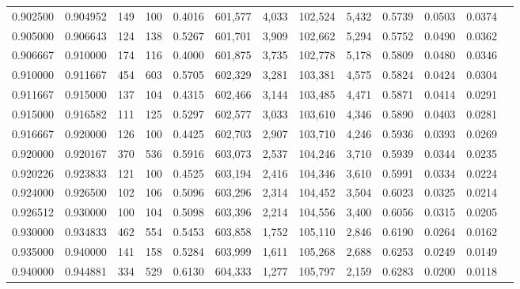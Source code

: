 \begin{tabular}{rrrrrrrrrrrrr}
0.902500 & 0.904952 &   149 & 100 &                                     0.4016 & 601,577 &   4,033 & 102,524 &   5,432 & 0.5739 & 0.0503 & 0.0374 \\
0.905000 & 0.906643 &   124 & 138 &                                     0.5267 & 601,701 &   3,909 & 102,662 &   5,294 & 0.5752 & 0.0490 & 0.0362 \\
0.906667 & 0.910000 &   174 & 116 &                                     0.4000 & 601,875 &   3,735 & 102,778 &   5,178 & 0.5809 & 0.0480 & 0.0346 \\
0.910000 & 0.911667 &   454 & 603 &                                     0.5705 & 602,329 &   3,281 & 103,381 &   4,575 & 0.5824 & 0.0424 & 0.0304 \\
0.911667 & 0.915000 &   137 & 104 &                                     0.4315 & 602,466 &   3,144 & 103,485 &   4,471 & 0.5871 & 0.0414 & 0.0291 \\
0.915000 & 0.916582 &   111 & 125 &                                     0.5297 & 602,577 &   3,033 & 103,610 &   4,346 & 0.5890 & 0.0403 & 0.0281 \\
0.916667 & 0.920000 &   126 & 100 &                                     0.4425 & 602,703 &   2,907 & 103,710 &   4,246 & 0.5936 & 0.0393 & 0.0269 \\
0.920000 & 0.920167 &   370 & 536 &                                     0.5916 & 603,073 &   2,537 & 104,246 &   3,710 & 0.5939 & 0.0344 & 0.0235 \\
0.920226 & 0.923833 &   121 & 100 &                                     0.4525 & 603,194 &   2,416 & 104,346 &   3,610 & 0.5991 & 0.0334 & 0.0224 \\
0.924000 & 0.926500 &   102 & 106 &                                     0.5096 & 603,296 &   2,314 & 104,452 &   3,504 & 0.6023 & 0.0325 & 0.0214 \\
0.926512 & 0.930000 &   100 & 104 &                                     0.5098 & 603,396 &   2,214 & 104,556 &   3,400 & 0.6056 & 0.0315 & 0.0205 \\
0.930000 & 0.934833 &   462 & 554 &                                     0.5453 & 603,858 &   1,752 & 105,110 &   2,846 & 0.6190 & 0.0264 & 0.0162 \\
0.935000 & 0.940000 &   141 & 158 &                                     0.5284 & 603,999 &   1,611 & 105,268 &   2,688 & 0.6253 & 0.0249 & 0.0149 \\
0.940000 & 0.944881 &   334 & 529 &                                     0.6130 & 604,333 &   1,277 & 105,797 &   2,159 & 0.6283 & 0.0200 & 0.0118 \\

\end{tabular}
